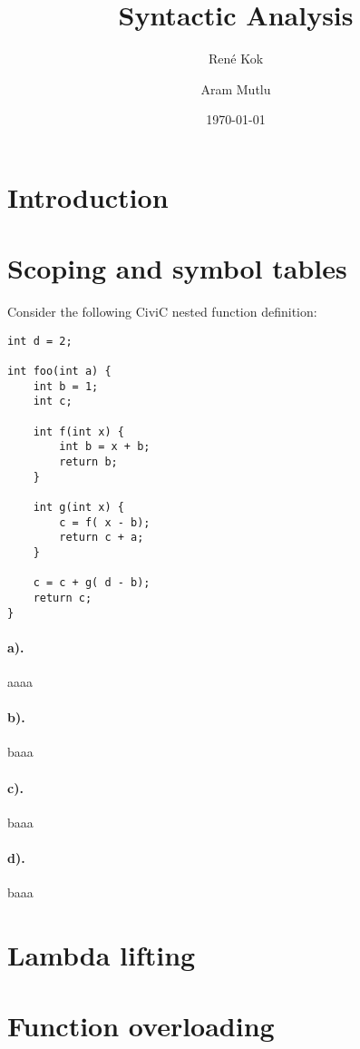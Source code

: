 \documentclass[hidelinks]{uva-inf-article}
\title{Syntactic Analysis}
\author{René Kok}
\author{Aram Mutlu}
\date{\today}
\begin{document}
\maketitle


\section{Introduction}
\begin{flushleft}
\newpage
\section{Scoping and symbol tables}
Consider the following CiviC nested function definition:
\begin{lstlisting}
int d = 2;

int foo(int a) {
    int b = 1; 
    int c;

    int f(int x) { 
        int b = x + b;
        return b; 
    }

    int g(int x) { 
        c = f( x - b); 
        return c + a;
    }
    
    c = c + g( d - b); 
    return c;
}
\end{lstlisting}
\paragraph{a).} aaaa
\paragraph{b).} baaa
\paragraph{c).} baaa
\paragraph{d).} baaa

\section{Lambda lifting}

\section{Function overloading}

\end{flushleft}
\end{document}
